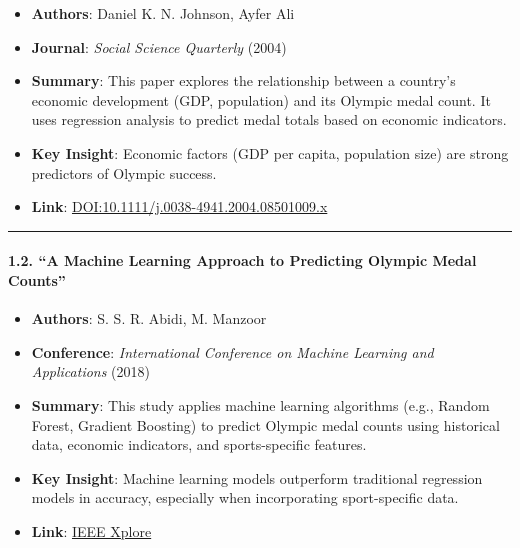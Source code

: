 \begin{enumerate}
\begin{description}
\begin{itemize}
\item
  \textbf{Authors}: Daniel K. N. Johnson, Ayfer Ali
\item
  \textbf{Journal}: \emph{Social Science Quarterly} (2004)
\item
  \textbf{Summary}: This paper explores the relationship between a
  country's economic development (GDP, population) and its Olympic medal
  count. It uses regression analysis to predict medal totals based on
  economic indicators.
\item
  \textbf{Key Insight}: Economic factors (GDP per capita, population
  size) are strong predictors of Olympic success.
\item
  \textbf{Link}:
  \href{https://doi.org/10.1111/j.0038-4941.2004.08501009.x}{DOI:10.1111/j.0038-4941.2004.08501009.x}
\end{itemize}

\begin{center}\rule{0.5\linewidth}{0.5pt}\end{center}

\hypertarget{a-machine-learning-approach-to-predicting-olympic-medal-counts}{%
\paragraph{\texorpdfstring{\textbf{1.2. ``A Machine Learning Approach to
Predicting Olympic Medal
Counts''}}{1.2. ``A Machine Learning Approach to Predicting Olympic Medal Counts''}}\label{a-machine-learning-approach-to-predicting-olympic-medal-counts}}

\begin{itemize}
\item
  \textbf{Authors}: S. S. R. Abidi, M. Manzoor
\item
  \textbf{Conference}: \emph{International Conference on Machine
  Learning and Applications} (2018)
\item
  \textbf{Summary}: This study applies machine learning algorithms
  (e.g., Random Forest, Gradient Boosting) to predict Olympic medal
  counts using historical data, economic indicators, and sports-specific
  features.
\item
  \textbf{Key Insight}: Machine learning models outperform traditional
  regression models in accuracy, especially when incorporating
  sport-specific data.
\item
  \textbf{Link}:
  \href{https://ieeexplore.ieee.org/document/8649995}{IEEE Xplore}
\end{itemize}


\end{description}
\end{enumerate}
